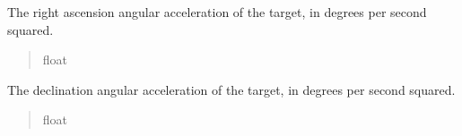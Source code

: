 \documentclass[letterpaper,11pt,english]{sphinxmanual}
\begin{document}
\begin{savenotes}
\begin{fulllineitems}

\begin{savenotes}\begin{fulllineitems}
\label{\detokenize{code/opihiexarata.ephemeris.solution:opihiexarata.ephemeris.solution.EphemeriticSolution.ra_acceleration}}
\pysigstartsignatures
{}
\pysigstopsignatures
\sphinxAtStartPar
The right ascension angular acceleration of the target, in degrees per
second squared.
\begin{quote}\begin{description}
\sphinxAtStartPar
float

\end{description}\end{quote}

\end{fulllineitems}\end{savenotes}


\begin{savenotes}\begin{fulllineitems}
\label{\detokenize{code/opihiexarata.ephemeris.solution:opihiexarata.ephemeris.solution.EphemeriticSolution.dec_acceleration}}
\pysigstartsignatures
{}
\pysigstopsignatures
\sphinxAtStartPar
The declination angular acceleration of the target, in degrees per
second squared.
\begin{quote}\begin{description}
\sphinxAtStartPar
float

\end{description}\end{quote}

\end{fulllineitems}\end{savenotes}



\end{fulllineitems}
\end{savenotes}
\end{document}
